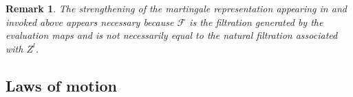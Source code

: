 \documentclass[11pt]{article}
\theoremstyle{plain}
\newtheorem{rmk}{Remark}[section]
\begin{document}
\begin{rmk}
The strengthening of the martingale representation appearing in \cite{cvitanic_optimal_2009} and invoked above appears necessary because $\mathcal{F}$ is the filtration generated by the evaluation maps and is not necessarily equal to the natural filtration associated with $Z^l$.
\end{rmk}

\subsection{Laws of motion} \label{laws}
\end{document}
